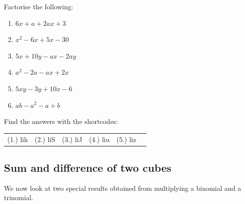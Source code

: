 \begin{exercises}{}{
\nopagebreak
Factorise the following:
\begin{multicols}{2}
\label{m39394*id279000}\begin{enumerate}[itemsep=5pt, label=\textbf{\arabic*}. ] 
\label{m39394*uid48}\item $6x+a+2ax+3$

\label{m39394*uid49}\item ${x}^{2}-6x+5x-30$
\label{m39394*uid50}\item $5x+10y-ax-2ay$
\label{m39394*uid51}\item ${a}^{2}-2a-ax+2x$
\label{m39394*uid52}\item $5xy-3y+10x-6$
\item $ab - a^{2} - a + b$
\end{enumerate}
\end{multicols}

\par {} Find the answers with the shortcodes:
\par \begin{tabular}[h]{cccccc}
(1.) lih  &  (2.) liS  &  (3.) liJ  &  (4.) liu  &  (5.) liz  & \end{tabular}
}
\end{exercises}

\noindent
\nopagebreak 
\label{m39387*secfhsst!!!underscore!!!id1562}\vspace{.5cm} 
\subsection*{Sum and difference of two cubes}      
We now look at two special results obtained from multiplying a binomial and a trinomial. 

